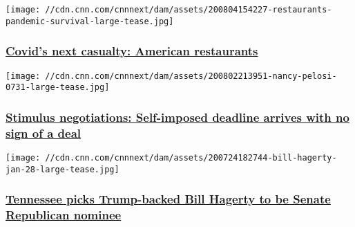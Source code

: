 \href{/2020/08/07/opinions/covid-19-restaurants-help-from-congress-avlon/index.html}{}

\texttt{[image: //cdn.cnn.com/cnnnext/dam/assets/200804154227-restaurants-pandemic-survival-large-tease.jpg]}

\hypertarget{covids-next-casualty-american-restaurants}{%
\subsubsection{\texorpdfstring{\href{/2020/08/07/opinions/covid-19-restaurants-help-from-congress-avlon/index.html}{Covid's
next casualty: American
restaurants}}{Covid's next casualty: American restaurants}}\label{covids-next-casualty-american-restaurants}}

\href{/2020/08/07/politics/congress-stimulus-negotiations-state-of-play/index.html}{}

\texttt{[image: //cdn.cnn.com/cnnnext/dam/assets/200802213951-nancy-pelosi-0731-large-tease.jpg]}

\hypertarget{stimulus-negotiations-self-imposed-deadline-arrives-with-no-sign-of-a-deal}{%
\subsubsection{\texorpdfstring{\href{/2020/08/07/politics/congress-stimulus-negotiations-state-of-play/index.html}{Stimulus
negotiations: Self-imposed deadline arrives with no sign of a
deal}}{Stimulus negotiations: Self-imposed deadline arrives with no sign of a deal}}\label{stimulus-negotiations-self-imposed-deadline-arrives-with-no-sign-of-a-deal}}

\href{/2020/08/06/politics/tennessee-republican-senate-primary-trump/index.html}{}

\texttt{[image: //cdn.cnn.com/cnnnext/dam/assets/200724182744-bill-hagerty-jan-28-large-tease.jpg]}

\hypertarget{tennessee-picks-trump-backed-bill-hagerty-to-be-senate-republican-nominee}{%
\subsubsection{\texorpdfstring{\href{/2020/08/06/politics/tennessee-republican-senate-primary-trump/index.html}{Tennessee
picks Trump-backed Bill Hagerty to be Senate Republican
nominee}}{Tennessee picks Trump-backed Bill Hagerty to be Senate Republican nominee}}\label{tennessee-picks-trump-backed-bill-hagerty-to-be-senate-republican-nominee}}

